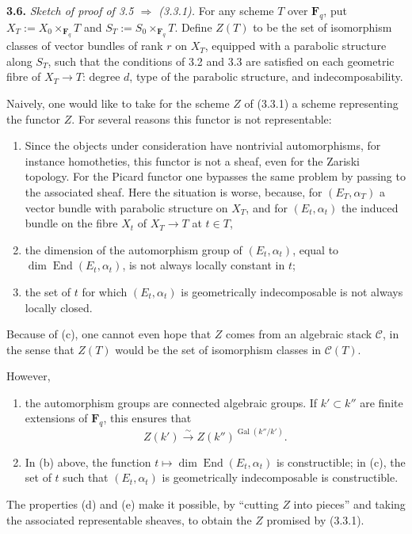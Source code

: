 \documentclass[11pt]{article}
\newcommand{\Fq}{\mathbf{F}_q}
\newcommand{\Gal}{\operatorname{Gal}}
\newcommand{\End}{\operatorname{End}}
\newcommand{\para}[1]{\medskip\noindent\textbf{#1}\enspace}
\begin{document}
\para{3.6.} \textit{Sketch of proof of 3.5 \(\Rightarrow\) (3.3.1).} For any scheme \(T\) over \(\Fq\), put \(X_T:=X_0\times_{\Fq}T\) and \(S_T:=S_0\times_{\Fq}T\). Define \(Z(T)\) to be the set of isomorphism classes of vector bundles of rank \(r\) on \(X_T\), equipped with a parabolic structure along \(S_T\), such that the conditions of 3.2 and 3.3 are satisfied on each geometric fibre of \(X_T\to T\): degree \(d\), type of the parabolic structure, and indecomposability.

Naively, one would like to take for the scheme \(Z\) of (3.3.1) a scheme representing the functor \(Z\). For several reasons this functor is not representable:
\begin{enumerate}[label=(\alph*),leftmargin=2.5em]
\item Since the objects under consideration have nontrivial automorphisms, for instance homotheties, this functor is not a sheaf, even for the Zariski topology. For the Picard functor one bypasses the same problem by passing to the associated sheaf. Here the situation is worse, because, for \((E_T,\alpha_T)\) a vector bundle with parabolic structure on \(X_T\), and for \((E_t,\alpha_t)\) the induced bundle on the fibre \(X_t\) of \(X_T\to T\) at \(t\in T\),
\item the dimension of the automorphism group of \((E_t,\alpha_t)\), equal to \(\dim\End(E_t,\alpha_t)\), is not always locally constant in \(t\);
\item the set of \(t\) for which \((E_t,\alpha_t)\) is geometrically indecomposable is not always locally closed.
\end{enumerate}
Because of (c), one cannot even hope that \(Z\) comes from an algebraic stack \(\mathcal C\), in the sense that \(Z(T)\) would be the set of isomorphism classes in \(\mathcal C(T)\).

However,
\begin{enumerate}[label=(\alph*),leftmargin=2.5em,start=4]
\item the automorphism groups are connected algebraic groups. If \(k'\subset k''\) are finite extensions of \(\Fq\), this ensures that
\[
  Z(k')\xrightarrow{\sim} Z(k'')^{\Gal(k''/k')} .
\]
\item In (b) above, the function \(t\mapsto\dim\End(E_t,\alpha_t)\) is constructible; in (c), the set of \(t\) such that \((E_t,\alpha_t)\) is geometrically indecomposable is constructible.
\end{enumerate}
The properties (d) and (e) make it possible, by ``cutting \(Z\) into pieces'' and taking the associated representable sheaves, to obtain the \(Z\) promised by (3.3.1).
\end{document}
